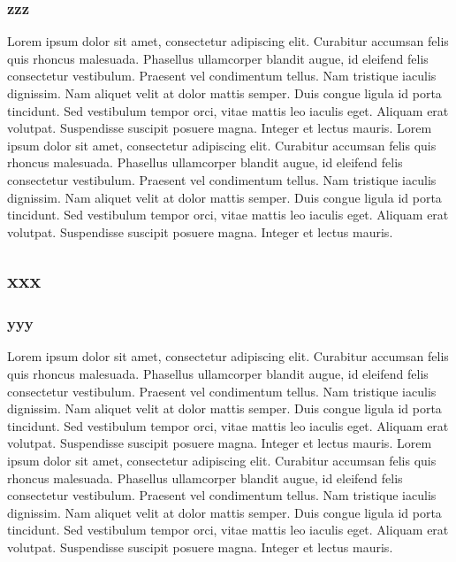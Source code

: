 \documentclass[12pt, a4paper]{book}
\newcommand\apparat[2]{\edtext{#1}{\Afootnote{#2}}}
\newcommand\apparatB[2]{\edtext{#1}{\Bfootnote{#2}}}
\begin{document}
\begin{pages}
\begin{Leftside}
\subsubsection{zzz}
\pend
\pstart
\begin{ledgroup}
\skipnumbering
Lorem ipsum dolor sit amet, consectetur adipiscing elit. Curabitur accumsan felis quis rhoncus malesuada. Phasellus ullamcorper blandit augue, id eleifend felis consectetur vestibulum. Praesent vel condimentum tellus. Nam tristique iaculis dignissim. Nam aliquet velit at dolor mattis semper. Duis congue ligula id porta tincidunt. Sed vestibulum tempor orci, vitae mattis leo iaculis eget. Aliquam erat volutpat. Suspendisse suscipit posuere magna. Integer et lectus mauris. \apparat{aaa}{eeee}
Lorem ipsum dolor sit amet, consectetur adipiscing elit. Curabitur accumsan felis quis rhoncus malesuada. Phasellus ullamcorper blandit augue, id eleifend felis consectetur vestibulum. Praesent vel condimentum tellus. Nam tristique iaculis dignissim. Nam aliquet velit at dolor mattis semper. Duis congue ligula id porta tincidunt. Sed vestibulum tempor orci, vitae mattis leo iaculis eget. Aliquam erat volutpat. Suspendisse suscipit posuere magna. Integer et lectus mauris. \apparatB{aaa}{eeee}
\end{ledgroup}
\pend
\endnumbering
\end{Leftside}

\begin{Rightside}
\beginnumbering
\pstart
\subsection{xxx} \skipnumbering
\subsubsection{yyy}
\pend
\pstart
\begin{ledgroup}
\skipnumbering
Lorem ipsum dolor sit amet, consectetur adipiscing elit. Curabitur accumsan felis quis rhoncus malesuada. Phasellus ullamcorper blandit augue, id eleifend felis consectetur vestibulum. Praesent vel condimentum tellus. Nam tristique iaculis dignissim. Nam aliquet velit at dolor mattis semper. Duis congue ligula id porta tincidunt. Sed vestibulum tempor orci, vitae mattis leo iaculis eget. Aliquam erat volutpat. Suspendisse suscipit posuere magna. Integer et lectus mauris. \apparat{aaa}{eeee}
Lorem ipsum dolor sit amet, consectetur adipiscing elit. Curabitur accumsan felis quis rhoncus malesuada. Phasellus ullamcorper blandit augue, id eleifend felis consectetur vestibulum. Praesent vel condimentum tellus. Nam tristique iaculis dignissim. Nam aliquet velit at dolor mattis semper. Duis congue ligula id porta tincidunt. Sed vestibulum tempor orci, vitae mattis leo iaculis eget. Aliquam erat volutpat. Suspendisse suscipit posuere magna. Integer et lectus mauris. \apparatB{aaa}{eeee}
\end{ledgroup}
\pend
\pstart

\end{Rightside}
\end{pages}
\end{document}
